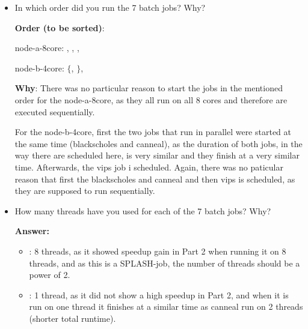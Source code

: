 \begin{enumerate}
\begin{enumerate}
\begin{itemize}
        Additionally, blackscholes and canneal are collocated on node-b-4core, as both of them have relatively low interference effects, and where blackscholes had medium interference with l2 cache, canneal has small interference effects. As they run on different cores, cpu and level 1 caches are isolated and do not interfere.
        \\

        \item In which order did you run the 7 batch jobs? Why?
    
        \textbf{Order (to be sorted)}:
        
        node-a-8core: , , , 
        
        node-b-4core: $\{$, $\}$, 
    
    
        \textbf{Why}: %
        There was no particular reason to start the jobs in the mentioned order for the node-a-8core, as they all run on all 8 cores and therefore are executed sequentially.

        For the node-b-4core, first the two jobs that run in parallel were started at the same time (blackscholes and canneal), as the duration of both jobs, in the way there are scheduled here, is very similar and they finish at a very similar time. Afterwards, the vips job i scheduled. Again, there was no paticular reason that first the blackscholes and canneal and then vips is scheduled, as they are supposed to run sequentially.
        \\

        \item How many threads have you used for each of the 7 batch jobs? Why?
    
        \textbf{Answer:}
    
        \begin{itemize}
            \item {}: 8 threads, as it showed speedup gain in Part 2 when running it on 8 threads, and as this is a SPLASH-job, the number of threads should be a power of 2. 
            
            \item {}: 1 thread, as it did not show a high speedup in Part 2, and when it is run on one thread it finishes at a similar time as canneal run on 2 threads (shorter total runtime).
            

\end{itemize}
\end{itemize}
\end{enumerate}
\end{enumerate}
